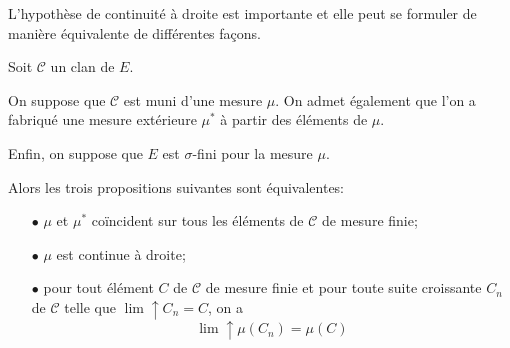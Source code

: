 L'hypothèse de continuité à droite est importante et elle peut se formuler de manière équivalente de différentes façons.

\begin{prop}
\label{continuite_droite}
Soit $\mathcal{C}$ un clan de $E$. 

On suppose que $\mathcal{C}$ est muni d'une mesure $\mu$. On admet également que l'on a fabriqué une mesure extérieure $\mu^{*}$ à partir des éléments de $\mu$.

Enfin, on suppose que $E$ est $\sigma$-fini pour la mesure $\mu$.

Alors les trois propositions suivantes sont équivalentes:
\begin{itemize}
\item[$\bullet$] $\mu$ et $\mu^{*}$ coïncident sur tous les éléments de $\mathcal{C}$ de mesure finie;
\item[$\bullet$] $\mu$ est continue à droite;
\item[$\bullet$] pour tout élément $C$ de $\mathcal{C}$ de mesure finie et pour toute suite croissante $C_n$ de $\mathcal{C}$ telle que $\lim \uparrow C_n = C$, on a
\[
\lim \uparrow \mu(C_n) = \mu(C)
\]
\end{itemize}
\end{prop}


